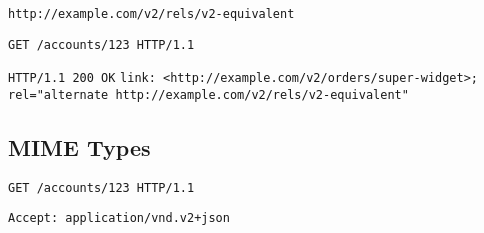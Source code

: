 \texttt{http://example.com/v2/rels/v2-equivalent}

\texttt{GET /accounts/123 HTTP/1.1}

\texttt{HTTP/1.1 200 OK}
\texttt{link: <http://example.com/v2/orders/super-widget>; rel="alternate http://example.com/v2/rels/v2-equivalent"}


\subsection{MIME Types}

\texttt{GET /accounts/123 HTTP/1.1}

\texttt{Accept: application/vnd.v2+json}
